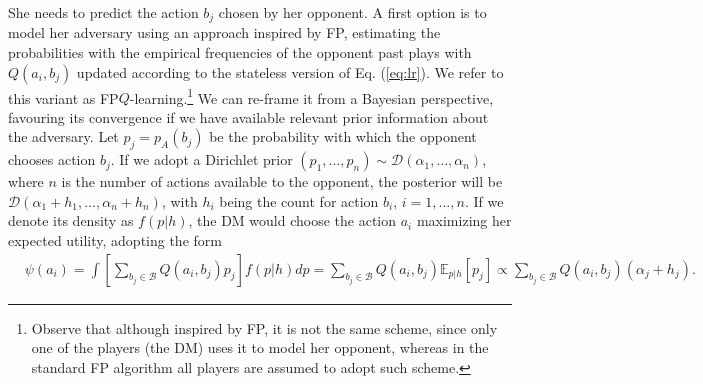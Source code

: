  She needs to predict the action
 $b_j$ chosen by her opponent. A first option is to model her adversary
 using an approach inspired by FP, 
 estimating the probabilities with the empirical frequencies of the opponent past plays
 with $Q(a_i, b_j)$ updated according to the stateless version of Eq. (\eqref{eq:lr}).
We refer to this variant as
FP$Q$-learning.\footnote{Observe that although inspired by FP,
it is not the same scheme, since only one of the players (the DM) uses it to 
model her opponent, whereas in the standard FP algorithm \parencite{brown1951iterative} all players 
are assumed to adopt such scheme.}
We can re-frame it from a Bayesian perspective,
favouring its convergence if we have available relevant  
prior information about the adversary. %
Let $p_j = p_A(b_j)$ be the probability with which
the opponent chooses action $b_j$. 
If we adopt a Dirichlet prior
$(p_1 , \ldots, p_n) \sim \mathcal{D}(\alpha_1,\ldots,\alpha_n)$,
where $n$ is the number of actions available to the opponent, 
the posterior will be  
$\mathcal{D}(\alpha_1 + h_1,\ldots,\alpha_n + h_n)$, with  $h_i$ 
being the count for action $b_i$, $i=1,...,n$. 
If we denote its density as $f(p|h)$, the DM would choose the action $a_i$ maximizing her expected utility,
adopting the form
\begin{eqnarray*}
& \psi(a_i)  = \int \left[\sum_{b_j \in \mathcal{B}}
Q(a_i, b_j) p_j\right] f(p|h) dp 
= \sum_{b_j \in \mathcal{B}} Q(a_i, b_j) \mathbb{E}_{p|h}[p_j]
\propto  \sum_{b_j \in \mathcal{B}} Q(a_i, b_j) (\alpha_j + h_j).
\end{eqnarray*}

